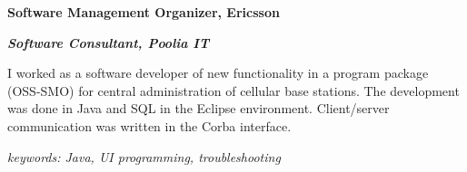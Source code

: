 \item[2005-2006] \textbf{Software Management Organizer, Ericsson}

\textit{\textbf{Software Consultant, Poolia IT}}

I worked as a software developer of new functionality in a program package (OSS-SMO) for central administration of cellular base stations. The development was done in Java and SQL in the Eclipse environment. Client/server communication was written in the Corba interface.

\textit{keywords: Java, UI programming, troubleshooting}